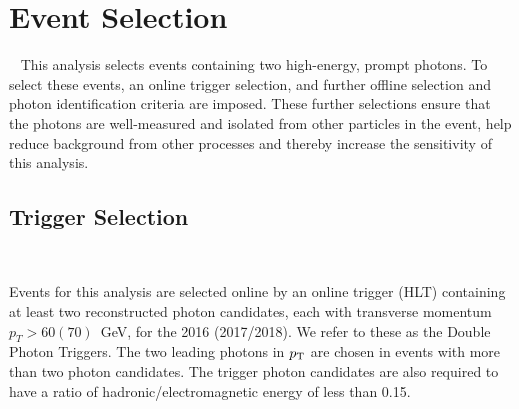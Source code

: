
\section{Event Selection}~\label{sec:EventSelection}
This analysis selects events containing two high-energy, prompt photons. To select these events, an online trigger selection, and further offline selection and photon identification criteria are imposed. These further selections ensure that the  photons are well-measured and isolated from other particles in the event, help reduce background from other processes and thereby increase the sensitivity of this analysis. 

\subsection{Trigger Selection}~\label{sec:TriggerSelection}

Events for this analysis are selected online by an online trigger (HLT) containing at least two reconstructed photon candidates, each with transverse momentum $p_{T} > 60 (70)$~GeV, for the 2016 (2017/2018). We refer to these as the Double Photon Triggers. The two leading photons in $p_{\mathrm{T}}$ are chosen in events with more than two photon candidates. The trigger photon candidates are also required to have a ratio of hadronic/electromagnetic energy of less than 0.15. 



